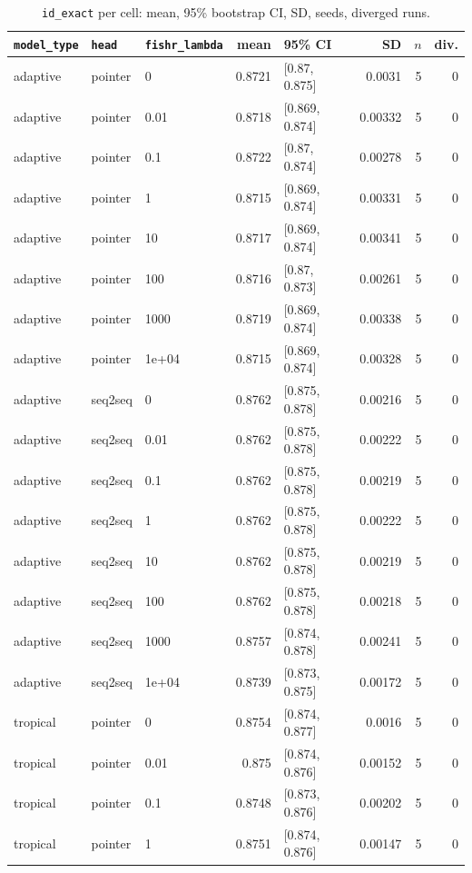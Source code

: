 \documentclass[10pt]{article}
\begin{document}
{\small
\begin{longtable}{lllrlrrr}
\caption{\texttt{id\_exact} per cell: mean, 95\% bootstrap CI, SD, seeds, diverged runs.}\label{tab:summary-id_exact}\\
\toprule
\texttt{model\_type} & \texttt{head} & \texttt{fishr\_lambda} & mean & 95\% CI & SD & $n$ & div.\\
\midrule
\endhead
adaptive & pointer & 0 & 0.8721 & [0.87, 0.875] & 0.0031 & 5 & 0\\
adaptive & pointer & 0.01 & 0.8718 & [0.869, 0.874] & 0.00332 & 5 & 0\\
adaptive & pointer & 0.1 & 0.8722 & [0.87, 0.874] & 0.00278 & 5 & 0\\
adaptive & pointer & 1 & 0.8715 & [0.869, 0.874] & 0.00331 & 5 & 0\\
adaptive & pointer & 10 & 0.8717 & [0.869, 0.874] & 0.00341 & 5 & 0\\
adaptive & pointer & 100 & 0.8716 & [0.87, 0.873] & 0.00261 & 5 & 0\\
adaptive & pointer & 1000 & 0.8719 & [0.869, 0.874] & 0.00338 & 5 & 0\\
adaptive & pointer & 1e+04 & 0.8715 & [0.869, 0.874] & 0.00328 & 5 & 0\\
adaptive & seq2seq & 0 & 0.8762 & [0.875, 0.878] & 0.00216 & 5 & 0\\
adaptive & seq2seq & 0.01 & 0.8762 & [0.875, 0.878] & 0.00222 & 5 & 0\\
adaptive & seq2seq & 0.1 & 0.8762 & [0.875, 0.878] & 0.00219 & 5 & 0\\
adaptive & seq2seq & 1 & 0.8762 & [0.875, 0.878] & 0.00222 & 5 & 0\\
adaptive & seq2seq & 10 & 0.8762 & [0.875, 0.878] & 0.00219 & 5 & 0\\
adaptive & seq2seq & 100 & 0.8762 & [0.875, 0.878] & 0.00218 & 5 & 0\\
adaptive & seq2seq & 1000 & 0.8757 & [0.874, 0.878] & 0.00241 & 5 & 0\\
adaptive & seq2seq & 1e+04 & 0.8739 & [0.873, 0.875] & 0.00172 & 5 & 0\\
tropical & pointer & 0 & 0.8754 & [0.874, 0.877] & 0.0016 & 5 & 0\\
tropical & pointer & 0.01 & 0.875 & [0.874, 0.876] & 0.00152 & 5 & 0\\
tropical & pointer & 0.1 & 0.8748 & [0.873, 0.876] & 0.00202 & 5 & 0\\
tropical & pointer & 1 & 0.8751 & [0.874, 0.876] & 0.00147 & 5 & 0\\

\end{longtable}}
\end{document}
